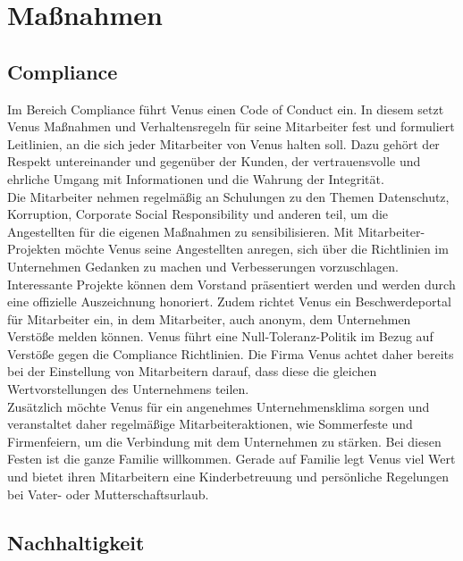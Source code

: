 \documentclass[a4paper, fontsize=12pt, parskip=full, toc=bibliographynumbered]{scrreprt}
\begin{document}




\chapter{Maßnahmen}

\section{Compliance}

Im Bereich Compliance führt Venus einen Code of Conduct ein. In diesem setzt Venus Maßnahmen und Verhaltensregeln für seine Mitarbeiter fest und formuliert
Leitlinien, an die sich jeder Mitarbeiter von Venus halten soll. Dazu gehört der Respekt untereinander und gegenüber der Kunden, der vertrauensvolle und ehrliche Umgang mit Informationen und die Wahrung der Integrität.\\
Die Mitarbeiter nehmen regelmäßig an Schulungen zu den Themen Datenschutz, Korruption, Corporate Social Responsibility und anderen teil, um die Angestellten für die eigenen Maßnahmen zu sensibilisieren. Mit Mitarbeiter-Projekten möchte Venus seine Angestellten anregen, sich über die Richtlinien im Unternehmen Gedanken zu machen und Verbesserungen vorzuschlagen. Interessante Projekte können dem Vorstand präsentiert werden und werden durch eine offizielle Auszeichnung honoriert. Zudem richtet Venus ein Beschwerdeportal für Mitarbeiter ein, in dem Mitarbeiter, auch anonym, dem Unternehmen Verstöße melden können. Venus führt eine Null-Toleranz-Politik im Bezug auf Verstöße gegen die Compliance Richtlinien. Die Firma Venus achtet daher bereits bei der Einstellung von Mitarbeitern darauf, dass diese die gleichen Wertvorstellungen des Unternehmens teilen.\\
Zusätzlich möchte Venus für ein angenehmes Unternehmensklima sorgen und veranstaltet daher regelmäßige Mitarbeiteraktionen, wie Sommerfeste und Firmenfeiern, um die Verbindung mit dem Unternehmen zu stärken. Bei diesen Festen ist die ganze Familie willkommen. Gerade auf Familie legt Venus viel Wert und bietet ihren Mitarbeitern eine Kinderbetreuung und persönliche Regelungen bei Vater- oder Mutterschaftsurlaub.


\section{Nachhaltigkeit}
\author{Autor: Leonie Schiburr}
\end{document}
